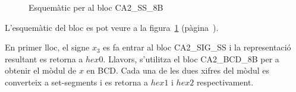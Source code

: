 \begin{figure}[b]
  \begin{center}
  \end{center}
  \caption{\label{fig:\projectname-CA2_SS_8B} Esquemàtic per al bloc \textsf{CA2\_SS\_8B}}
\end{figure}

L'esquemàtic del bloc es pot veure a la figura~\ref{fig:\projectname-CA2_SS_8B} (pàgina~\pageref{fig:\projectname-CA2_SS_8B}).

En primer lloc, el signe $x_3$ es fa entrar al bloc \textsf{CA2\_SIG\_SS} i la
representació resultant es retorna a $hex0$. Llavors, s'utilitza el bloc
\textsf{CA2\_BCD\_8B} per a obtenir el mòdul de $x$ en BCD. Cada una de les dues
xifres del mòdul es converteix a set-segments i es retorna a $hex1$ i $hex2$
respectivament.

\vspace{1cm}
